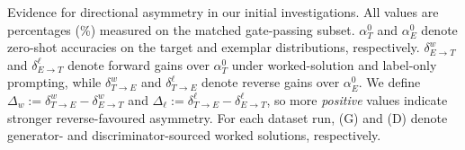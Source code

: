 \documentclass{article}
\begin{document}
\begin{table}[ht]
\caption{
Evidence for directional asymmetry in our initial investigations. All values are percentages (\%) measured on the matched gate-passing subset. 
$\alpha_T^{0}$ and $\alpha_E^{0}$ denote zero-shot accuracies on the target and exemplar distributions, respectively. 
$\delta_{E \to T}^w$ and $\delta_{E \to T}^\ell$ denote forward gains over $\alpha_T^{0}$ under worked-solution and label-only prompting, while 
$\delta_{T \to E}^w$ and $\delta_{T \to E}^\ell$ denote reverse gains over $\alpha_E^{0}$. 
We define $\Delta_w := \delta_{T \to E}^w - \delta_{E \to T}^w$ and $\Delta_\ell := \delta_{T \to E}^\ell - \delta_{E \to T}^\ell$, 
so more \emph{positive} values indicate stronger reverse-favoured asymmetry. 
For each dataset run, (G) and (D) denote generator- and discriminator-sourced worked solutions, respectively.
}
\label{tab:asymmetry-standardized}
\end{table}
\end{document}
